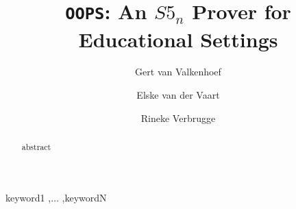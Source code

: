 \documentclass[preprint]{elsarticle}
\newcommand{\oops}{\texttt{OOPS}}
\begin{document}
\begin{frontmatter}
\title{\oops: An $S5_n$ Prover for Educational Settings}

\author[gert]{Gert van Valkenhoef}
\author[ai]{Elske van der Vaart}
\author[ai]{Rineke Verbrugge}

\address[gert]{Department of Business and ICT, University of Groningen,\\
P.O. Box 800, 9700 AV, Groningen, The Netherlands}

\address[ai]{Department of Artificial Intelligence, University of Groningen,\\
P.O. Box 407, 9700 AK, Groningen, The Netherlands}

\begin{abstract}
abstract
\end{abstract}

\begin{keyword}
keyword1 \sep $\dots$ \sep keywordN
\end{keyword}

\end{frontmatter}












\end{document}
